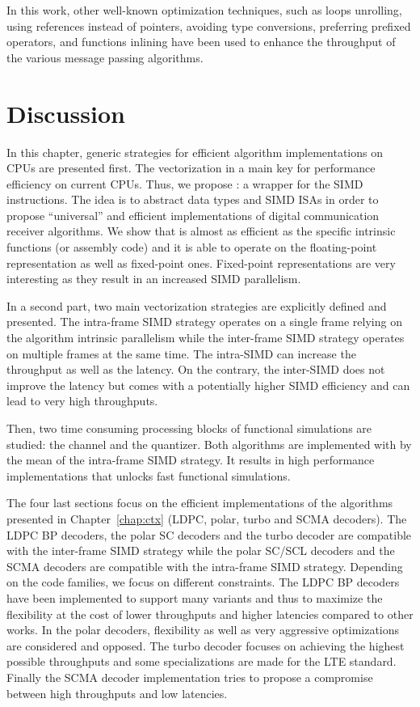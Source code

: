 In this work, other well-known optimization techniques, such as loops unrolling,
using references instead of pointers, avoiding type conversions, preferring
prefixed operators, and functions inlining have been used to enhance the
throughput of the various message passing algorithms.

\section{Discussion}

In this chapter, generic strategies for efficient algorithm implementations on
CPUs are presented first. The vectorization in a main key for performance
efficiency on current CPUs. Thus, we propose \MIPP: a wrapper for the SIMD
instructions. The idea is to abstract data types and SIMD ISAs in order to
propose ``universal'' and efficient implementations of digital communication
receiver algorithms. We show that \MIPP is almost as efficient as the specific
intrinsic functions (or assembly code) and it is able to operate on
the floating-point representation as well as fixed-point ones. Fixed-point
representations are very interesting as they result in an increased SIMD
parallelism.

In a second part, two main vectorization strategies are explicitly defined and
presented. The intra-frame SIMD strategy operates on a single frame relying
on the algorithm intrinsic parallelism while the inter-frame SIMD strategy
operates on multiple frames at the same time. The intra-SIMD can increase the
throughput as well as the latency. On the contrary, the inter-SIMD does not
improve the latency but comes with a potentially higher SIMD efficiency and can
lead to very high throughputs.

Then, two time consuming processing blocks of functional simulations are
studied: the channel and the quantizer. Both algorithms are implemented with
\MIPP by the mean of the intra-frame SIMD strategy. It results in high
performance implementations that unlocks fast functional simulations.

The four last sections focus on the efficient implementations of the algorithms
presented in Chapter~\ref{chap:ctx} (LDPC, polar, turbo and SCMA decoders). The
LDPC BP decoders, the polar SC decoders and the turbo decoder are compatible
with the inter-frame SIMD strategy while the polar SC/SCL decoders and the SCMA
decoders are compatible with the intra-frame SIMD strategy. Depending on the
code families, we focus on different constraints. The LDPC BP decoders have been
implemented to support many variants and thus to maximize the flexibility at the
cost of lower throughputs and higher latencies compared to other works. In the
polar decoders, flexibility as well as very aggressive optimizations are
considered and opposed. The turbo decoder focuses on achieving the highest
possible throughputs and some specializations are made for the LTE standard.
Finally the SCMA decoder implementation tries to propose a compromise between
high throughputs and low latencies.

